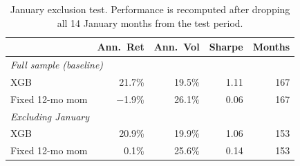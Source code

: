 \begin{table}[H]
\centering
\small
\begin{tabular}{l r r r r}
\toprule
 & Ann.\ Ret & Ann.\ Vol & Sharpe & Months \\
\midrule
\multicolumn{5}{l}{\emph{Full sample (baseline)}} \\
XGB & 21.7\% & 19.5\% & 1.11 & 167 \\
Fixed 12-mo mom & $-$1.9\% & 26.1\% & 0.06 & 167 \\
\midrule
\multicolumn{5}{l}{\emph{Excluding January}} \\
XGB & 20.9\% & 19.9\% & 1.06 & 153 \\
Fixed 12-mo mom & 0.1\% & 25.6\% & 0.14 & 153 \\
\bottomrule
\end{tabular}
\caption{January exclusion test. Performance is recomputed after dropping all 14 January months from the test period.}
\label{tab:january}
\end{table}